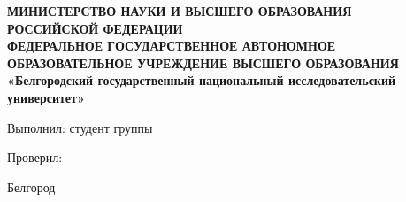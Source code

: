 \begin{titlepage}
\thispagestyle{empty}
\setlength{\parindent}{0ex} 

\begin{center}
  \textbf{МИНИСТЕРСТВО НАУКИ И ВЫСШЕГО ОБРАЗОВАНИЯ\\
РОССИЙСКОЙ ФЕДЕРАЦИИ\\
ФЕДЕРАЛЬНОЕ ГОСУДАРСТВЕННОЕ АВТОНОМНОЕ ОБРАЗОВАТЕЛЬНОЕ УЧРЕЖДЕНИЕ
ВЫСШЕГО ОБРАЗОВАНИЯ
«Белгородский государственный национальный исследовательский университет»
}
\end{center}

\vspace{50mm}

\begin{center}
  \LabLineTitle
  \SubjectLineTitle
  \ThemeLineTitle
\end{center}

\vspace{40mm}

\begin{minipage}{.60\linewidth}
    Выполнил: студент группы \Group

    \smallskip

    Проверил:
\end{minipage}
\hfill
\begin{minipage}{.4\linewidth}
  \begin{flushright}
    \AuthorFIO

    \smallskip

    \LecturerFIO
  \end{flushright}
\end{minipage}

\vfill
\begin{center}
  Белгород \Year
\end{center}

\setlength{\parindent}{1.25cm} 
\end{titlepage}
